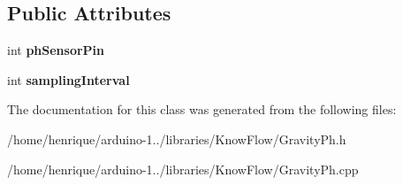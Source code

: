 \subsection*{Public Attributes}
\begin{DoxyCompactItemize}
\item 
int {\bfseries ph\+Sensor\+Pin}\hypertarget{class_gravity_ph_a30ac3cfec7506aef36cca0ed94309171}{}\label{class_gravity_ph_a30ac3cfec7506aef36cca0ed94309171}

\item 
int {\bfseries sampling\+Interval}\hypertarget{class_gravity_ph_a2f0ead9fbd3614ea4e84223e2b26dd0e}{}\label{class_gravity_ph_a2f0ead9fbd3614ea4e84223e2b26dd0e}

\end{DoxyCompactItemize}


The documentation for this class was generated from the following files\+:\begin{DoxyCompactItemize}
\item 
/home/henrique/arduino-\/1../libraries/\+Know\+Flow/Gravity\+Ph.\+h\item 
/home/henrique/arduino-\/1../libraries/\+Know\+Flow/Gravity\+Ph.\+cpp\end{DoxyCompactItemize}
